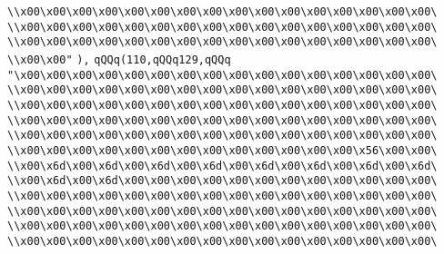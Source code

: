 \verb|\\x00\x00\x00\x00\x00\x00\x00\x00\x00\x00\x00\x00\x00\x00\x00\x00\|\newline
\verb|\\x00\x00\x00\x00\x00\x00\x00\x00\x00\x00\x00\x00\x00\x00\x00\x00\|\newline
\verb|\\x00\x00\x00\x00\x00\x00\x00\x00\x00\x00\x00\x00\x00\x00\x00\x00\|\newline
\verb|\\x00\x00"|\newline
\verb|),|\newline
\verb|qQQq(110,qQQq129,qQQq|\newline
\verb|"\x00\x00\x00\x00\x00\x00\x00\x00\x00\x00\x00\x00\x00\x00\x00\x00\|\newline
\verb|\\x00\x00\x00\x00\x00\x00\x00\x00\x00\x00\x00\x00\x00\x00\x00\x00\|\newline
\verb|\\x00\x00\x00\x00\x00\x00\x00\x00\x00\x00\x00\x00\x00\x00\x00\x00\|\newline
\verb|\\x00\x00\x00\x00\x00\x00\x00\x00\x00\x00\x00\x00\x00\x00\x00\x00\|\newline
\verb|\\x00\x00\x00\x00\x00\x00\x00\x00\x00\x00\x00\x00\x00\x00\x00\x00\|\newline
\verb|\\x00\x00\x00\x00\x00\x00\x00\x00\x00\x00\x00\x00\x00\x56\x00\x00\|\newline
\verb|\\x00\x6d\x00\x6d\x00\x6d\x00\x6d\x00\x6d\x00\x6d\x00\x6d\x00\x6d\|\newline
\verb|\\x00\x6d\x00\x6d\x00\x00\x00\x00\x00\x00\x00\x00\x00\x00\x00\x00\|\newline
\verb|\\x00\x00\x00\x00\x00\x00\x00\x00\x00\x00\x00\x00\x00\x00\x00\x00\|\newline
\verb|\\x00\x00\x00\x00\x00\x00\x00\x00\x00\x00\x00\x00\x00\x00\x00\x00\|\newline
\verb|\\x00\x00\x00\x00\x00\x00\x00\x00\x00\x00\x00\x00\x00\x00\x00\x00\|\newline
\verb|\\x00\x00\x00\x00\x00\x00\x00\x00\x00\x00\x00\x00\x00\x00\x00\x00\|\newline
